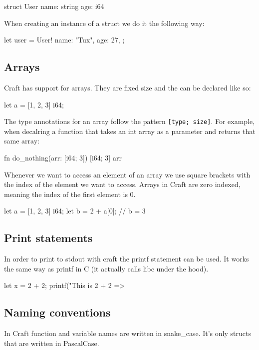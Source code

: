 ﻿\documentclass[10pt,a4paper,twocolumn,twoside]{article}
\begin{document}
\begin{code}
struct User {
    name: string
    age: i64
}
\end{code}

When creating an instance of a struct we do it the following way:

\begin{code}
    let user = User!{
        name: "Tux",
        age: 27,
    };
\end{code}

\subsection{Arrays}
Craft has support for arrays. They are fixed size and the can be declared like
so:

\begin{code}
let a = [1, 2, 3] i64;
\end{code}

The type annotations for an array follow the pattern \texttt{[type; size]}. 
For example, when decalring a function that takes an int array as a parameter 
and returns that same array:

\begin{code}
fn do_nothing(arr: [i64; 3]) [i64; 3] {
    arr
}
\end{code}

Whenever we want to access an element of an array we use square brackets with 
the index of the element we want to access. Arrays in Craft are zero indexed, 
meaning the index of the first element is 0.

\begin{code}
let a = [1, 2, 3] i64;
let b = 2 + a[0]; // b = 3
\end{code}

\subsection{Print statements}
In order to print to stdout with craft the printf statement can be used. It
works the same way as printf in C (it actually calls libc under the hood).

\begin{code}
    let x = 2 + 2;
    printf("This is 2 + 2 => %
\end{code}

\subsection{Naming conventions}
In Craft function and variable names are written in snake\_case. It's 
only structs that are written in PascalCase.
\end{document}
